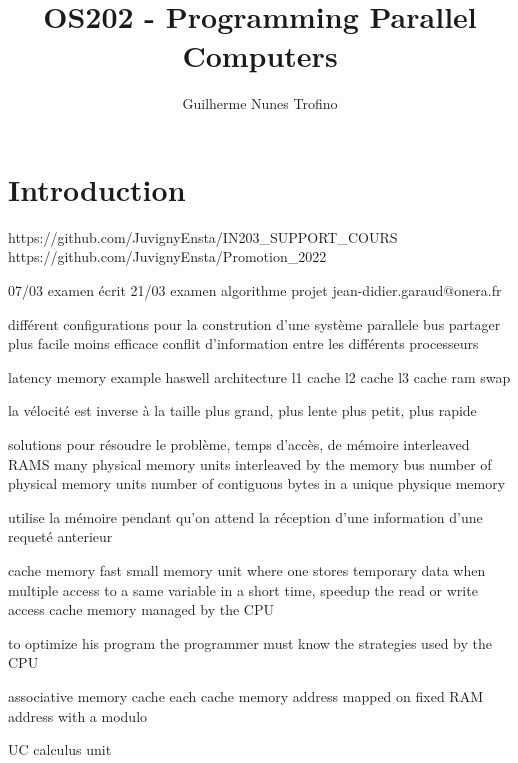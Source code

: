 \documentclass{article}
\title{OS202 - Programming Parallel Computers}
\author{Guilherme Nunes Trofino}
\begin{document}
\maketitle
\setlength{\parindent}{0pt}

\newpage\tableofcontents

\section{Introduction}
% 
% 

% 

https://github.com/JuvignyEnsta/IN203_SUPPORT_COURS
https://github.com/JuvignyEnsta/Promotion_2022


07/03 examen écrit
21/03 examen algorithme
projet
jean-didier.garaud@onera.fr



différent configurations pour la constrution d'une système parallele
    bus partager
        plus facile
        moins efficace
        conflit d'information entre les différents processeurs

latency memory example haswell architecture
l1 cache
l2 cache
l3 cache
ram
swap

la vélocité est inverse à la taille
plus grand, plus lente
plus petit, plus rapide

solutions pour résoudre le problème, temps d'accès, de mémoire
    interleaved RAMS
        many physical memory units interleaved by the memory bus
        number of physical memory units
        number of contiguous bytes in a unique physique memory

        utilise la mémoire pendant qu'on attend la réception d'une information d'une requeté anterieur

    cache memory fast small memory unit where one stores temporary data
        when multiple access to a same variable in a short time, speedup the read or write access
        cache memory managed by the CPU

        to optimize his program the programmer must know the strategies used by the CPU

        associative memory cache each cache memory address mapped on fixed RAM address with a modulo

UC calculus unit
\end{document}
